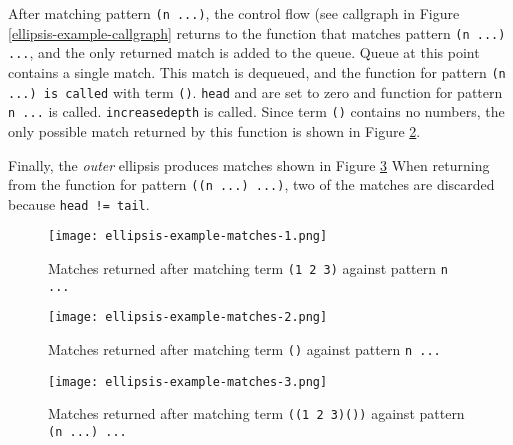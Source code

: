 After matching pattern \texttt{(n ...)}, the control flow (see callgraph in Figure \ref{ellipsis-example-callgraph} returns to the function that matches pattern \texttt{(n ...) ...}, and the only returned match is added to the queue. Queue at this point contains a single match. This match is dequeued, and the function for pattern \texttt{(n ...) is called} with term \texttt{()}. \texttt{head} and  are set to zero and function for pattern \texttt{n ...} is called. \texttt{increasedepth} is called. Since term \texttt{()} contains no numbers, the only possible match returned by this function is shown in Figure \ref{ellipsis-example-matches-2}.

Finally, the \textit{outer} ellipsis produces matches shown in Figure \ref{ellipsis-example-matches-3} When returning from the function for pattern \texttt{((n ...) ...)}, two of the matches are discarded because \texttt{head != tail}.

\begin{figure}[!htb]
\texttt{[image: ellipsis-example-matches-1.png]}
\caption{Matches returned after matching term \texttt{(1 2 3)} against pattern \texttt{n ...}}
\label{ellipsis-example-matches-1}
\end{figure}

\begin{figure}[!tbh]
\texttt{[image: ellipsis-example-matches-2.png]}
\caption{Matches returned after matching term \texttt{()} against pattern \texttt{n ...}}
\label{ellipsis-example-matches-2}
\end{figure}

\begin{figure}[!htb]
\texttt{[image: ellipsis-example-matches-3.png]}
\caption{Matches returned after matching term \texttt{((1 2 3)())} against pattern \texttt{(n ...) ...} }
\label{ellipsis-example-matches-3}
\end{figure}

